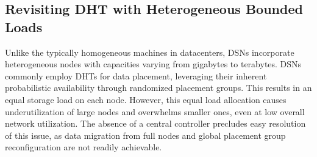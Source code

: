 
\subsection{Revisiting DHT with Heterogeneous Bounded Loads}
\label{sec:bg:problem}

Unlike the typically homogeneous machines in datacenters, DSNs incorporate heterogeneous nodes with capacities varying from gigabytes to terabytes.
DSNs~\cite{haeberlen2005glacier,kubiatowicz2000oceanstore,dabek2001wide,druschel2001past} commonly employ DHTs for data placement, leveraging their inherent probabilistic availability through randomized placement groups.
This results in an equal storage load on each node.
However, this equal load allocation causes underutilization of large nodes and overwhelms smaller ones, even at low overall network utilization.
The absence of a central controller precludes easy resolution of this issue, as data migration from full nodes and global placement group reconfiguration are not readily achievable.

